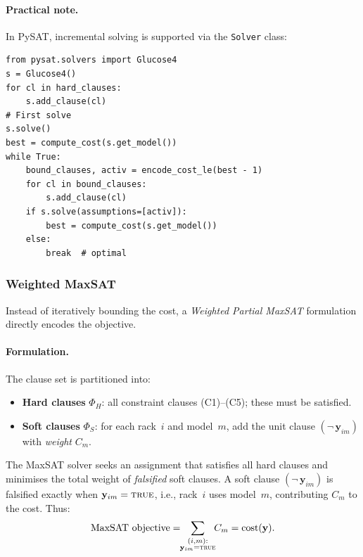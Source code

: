 \documentclass[11pt,a4paper]{article}
\begin{document}
\paragraph{Practical note.}
In PySAT, incremental solving is supported via the
\texttt{Solver} class:
\begin{verbatim}
from pysat.solvers import Glucose4
s = Glucose4()
for cl in hard_clauses:
    s.add_clause(cl)
# First solve
s.solve()
best = compute_cost(s.get_model())
while True:
    bound_clauses, activ = encode_cost_le(best - 1)
    for cl in bound_clauses:
        s.add_clause(cl)
    if s.solve(assumptions=[activ]):
        best = compute_cost(s.get_model())
    else:
        break  # optimal
\end{verbatim}

\subsubsection{Weighted MaxSAT}
\label{sec:opt-maxsat}

Instead of iteratively bounding the cost, a \emph{Weighted Partial
MaxSAT} formulation directly encodes the objective.

\paragraph{Formulation.}
The clause set is partitioned into:
\begin{itemize}
  \item \textbf{Hard clauses} $\Phi_H$: all constraint clauses
        (C1)--(C5);
        these must be satisfied.
  \item \textbf{Soft clauses} $\Phi_S$: for each rack~$i$ and
        model~$m$, add the unit clause
        $(\neg\, \mathbf{y}_{im})$ with \emph{weight} $C_m$.
\end{itemize}
The MaxSAT solver seeks an assignment that satisfies all hard
clauses and minimises the total weight of \emph{falsified} soft
clauses.  A soft clause $(\neg\, \mathbf{y}_{im})$ is falsified
exactly when $\mathbf{y}_{im} = \textsc{true}$, i.e., rack~$i$
uses model~$m$, contributing $C_m$ to the cost.  Thus:
\[
  \text{MaxSAT objective}
  = \!\!\sum_{\substack{(i,m):\\ \mathbf{y}_{im} = \textsc{true}}}
    \!\! C_m
  = \mathrm{cost}(\mathbf{y}).
\]
\end{document}
